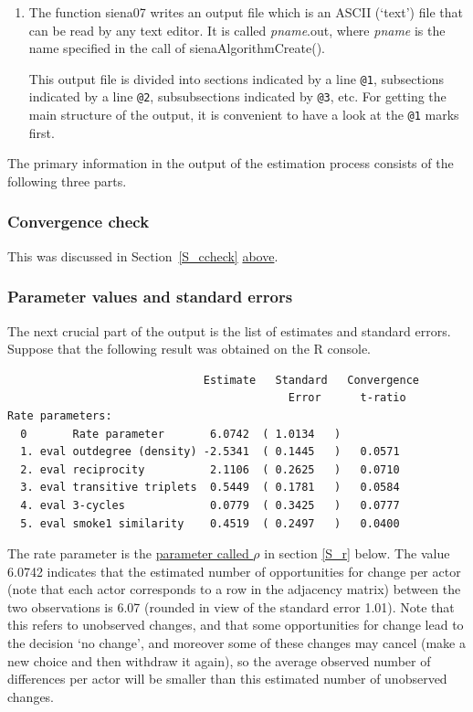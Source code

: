 \documentclass[a4paper,fleqn,11pt]{article}
\newcommand{\+}{\, + \,}
\newcommand{\R}{{\sf R }}
\begin{document}
\begin{enumerate}
  \item The function \textsf{siena07}
        writes an output file which is an ASCII (`text') file that can be
        read by any text editor.
        It is called \textsf{\textsl{pname}.out},
        where \textsf{\textsl{pname}} is the name
        specified in the call of \textsf{sienaAlgorithmCreate()}.

        This output file is divided into sections
        indicated by a line {\tt @1},
        subsections indicated by a line {\tt @2}, subsubsections indicated
        by {\tt @3}, etc. For getting the main structure of the output, it
        is convenient to have a look at the {\tt @1} marks first.
\end{enumerate}

The primary information in the output of the estimation process
consists of the following three parts.

\subsubsection{Convergence check}

This was discussed in Section~\ref{S_ccheck} \hyperlink{T_convergence}{above}.
\medskip

\subsubsection{Parameter values and standard errors}

The next crucial part of the output is the list of estimates and
standard errors. Suppose that the
following result was obtained on the \R console.

{\footnotesize
\begin{verbatim}
                              Estimate   Standard   Convergence
                                           Error      t-ratio
Rate parameters:
  0       Rate parameter       6.0742  ( 1.0134   )
  1. eval outdegree (density) -2.5341  ( 0.1445   )   0.0571
  2. eval reciprocity          2.1106  ( 0.2625   )   0.0710
  3. eval transitive triplets  0.5449  ( 0.1781   )   0.0584
  4. eval 3-cycles             0.0779  ( 0.3425   )   0.0777
  5. eval smoke1 similarity    0.4519  ( 0.2497   )   0.0400
\end{verbatim}
}

The rate parameter is the
\hyperlink{T_rho}{parameter called $\rho$}
in section \ref{S_r} below. The value 6.0742 indicates
that the estimated number of opportunities
for change per actor (note that each actor
corresponds to a row in the adjacency matrix)
between the two observations is
6.07 (rounded in view of the standard error 1.01). Note that this
refers to unobserved changes, and that some
opportunities for change lead to the decision `no change',
and moreover some of these changes may
cancel (make a new choice and then withdraw it again), so the
average observed number of differences per actor will be
smaller than this estimated number of unobserved changes.
\end{document}
